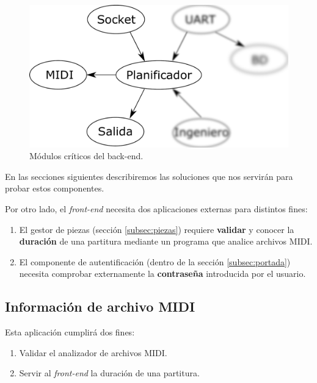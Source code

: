 \begin{figure}[H]
	\noindent \begin{centering}
		\includegraphics[width=\linewidth/2]{capitulo4/daemon_critical}
		\par\end{centering}
	\smallskip
	\caption{\label{fig:daemon_critical} Módulos críticos del back-end.}
\end{figure} 

\smallskip

En las secciones siguientes describiremos las soluciones que nos servirán para probar estos componentes.

Por otro lado, el \textit{front-end} necesita dos aplicaciones externas para distintos fines:

\begin{enumerate}
	\item El gestor de piezas (sección \ref{subsec:piezas}) requiere \textbf{validar} y conocer la \textbf{duración} de una partitura mediante un programa que analice archivos \acrshort{MIDI}.
	\item El componente de autentificación (dentro de la sección \ref{subsec:portada}) necesita comprobar externamente la \textbf{contraseña} introducida por el usuario.
\end{enumerate}

\subsection{Información de archivo MIDI}
\label{subsec:midinfo}

Esta aplicación cumplirá dos fines:

\begin{enumerate}
	\item Validar el analizador de archivos \acrshort{MIDI}.
	\item Servir al \textit{front-end} la duración de una partitura.
\end{enumerate}


